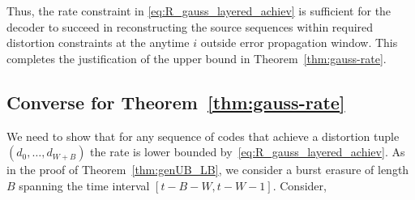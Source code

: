 \documentclass[journal, twocolumn, 10pt]{IEEEtran}
\newtheorem{remark}{Remark}
\newcommand{\bc}{{\mathbf{c}}}
\newcommand{\cM}{{\mathcal{M}}}
\begin{document}
{Thus, the rate constraint in \eqref{eq:R_gauss_layered_achiev} is sufficient for the decoder to succeed in reconstructing the source sequences within required distortion constraints at the anytime $i$ outside error propagation window.
This completes the justification of the upper bound in Theorem~\ref{thm:gauss-rate}.  

\subsection{Converse for Theorem~\ref{thm:gauss-rate}}
\label{subsec:G-Converse}
We need to show that for any sequence of codes that achieve a distortion tuple $(d_0,\ldots, d_{W+B})$ the rate is lower bounded by~\eqref{eq:R_gauss_layered_achiev}.
As in the proof of Theorem~\ref{thm:genUB_LB}, we consider a burst erasure  of length $B$ spanning the time interval $[t-B-W, t-W-1]$. Consider,

}
\end{document}
